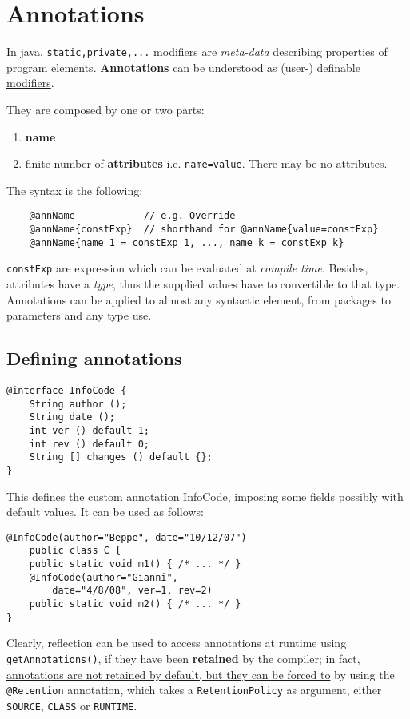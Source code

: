\chapter{Annotations}
In java, \lstinline{static,private,...} modifiers are \textit{meta-data} describing properties of program elements.
\ul{\textbf{Annotations} can be understood as (user-) definable modifiers}.
{They are composed by one or two parts:\ns
\begin{enumerate}
    \item \textbf{name}
    \item finite number of \textbf{attributes} i.e. \lstinline{name=value}.
    There may be no attributes.
\end{enumerate}}
The syntax is the following:
\begin{lstlisting}
    @annName            // e.g. Override
    @annName{constExp}  // shorthand for @annName{value=constExp}
    @annName{name_1 = constExp_1, ..., name_k = constExp_k}
\end{lstlisting}
\lstinline{constExp} are expression which can be evaluated at \textit{compile time}.
Besides, attributes have a \textit{type}, thus the supplied values have to
convertible to that type.\\
Annotations can be applied to almost any syntactic element, from packages to parameters and any type use.

\section{Defining annotations}
\begin{lstlisting}
@interface InfoCode {
    String author ();
    String date ();
    int ver () default 1;
    int rev () default 0;
    String [] changes () default {};
}
\end{lstlisting}

This defines the custom annotation InfoCode, imposing some fields possibly with default values.
It can be used as follows:
\begin{lstlisting}
@InfoCode(author="Beppe", date="10/12/07")
    public class C {
    public static void m1() { /* ... */ }
    @InfoCode(author="Gianni",
        date="4/8/08", ver=1, rev=2)
    public static void m2() { /* ... */ }
}
\end{lstlisting}

Clearly, reflection can be used to access annotations at runtime using \lstinline|getAnnotations()|, if they have been \textbf{retained} by the compiler;
in fact, \ul{annotations are not retained by default, but they can be forced to} by using the \lstinline{@Retention} annotation, which takes a \lstinline{RetentionPolicy} as argument, either \lstinline{SOURCE}, \lstinline{CLASS} or \lstinline{RUNTIME}.